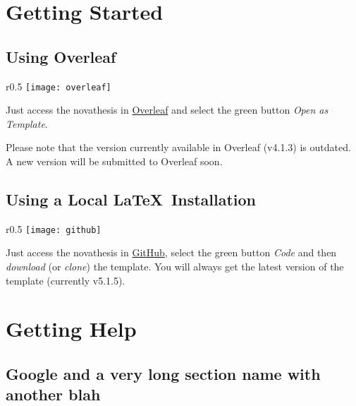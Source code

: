 \section{Getting Started}
\label{sec:getting_started}

\subsection{Using Overleaf}
\label{sub:using_overleaf}

\begin{wrapfigure}{r}{0.5\linewidth}
\vspace*{-15ex}\texttt{[image: overleaf]}%
\end{wrapfigure}

Just access the \acrlong{novathesis} in \href{https://www.overleaf.com/latex/templates/new-university-of-lisbon-universidade-nova-de-lisboa-slash-unl-thesis-template/fwbztcrptjmg}{Overleaf} and select the green button \emph{Open as Template}. 

Please note that the version currently available in Overleaf (v4.1.3) is outdated. A new version will be submitted to Overleaf soon.  

\subsection{Using a Local \LaTeX\ Installation}
\label{sub:using_local_latex}

\begin{wrapfigure}{r}{0.5\linewidth}
\vspace*{-15ex}\texttt{[image: github]}%
\end{wrapfigure}

Just access the \acrlong{novathesis} in \href{https://github.com/joaomlourenco/novathesis}{GitHub}, select the green button \emph{Code} and then \emph{download} (or \emph{clone}) the template.  You will always get the latest version of the template (currently v5.1.5).


\section{Getting Help}
\label{sec:getting_help}

\begin{center}  
\end{center}
 
\subsection{Google and a very long section name with another blah}
\label{sub:group_google}

